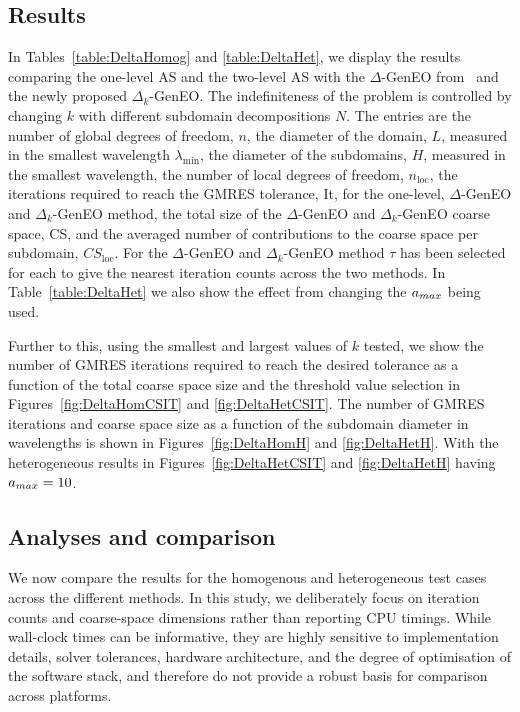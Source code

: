 \documentclass[preprint,3p,times]{elsarticle}
\newcommand{\amax}{a_{\textup{\textsf{max}}}}
\theoremstyle{definition}
\numberwithin{equation}{section}
\begin{document}
{\subsection{Results}
In Tables~\ref{table:DeltaHomog} and \ref{table:DeltaHet}, we display the results comparing the one-level AS and the two-level AS 
with the $\Delta$-GenEO from~\cite{Bootland:2022:OSM} and the newly proposed $\Delta_k$-GenEO. 
The indefiniteness of the problem is controlled by changing $k$ with different subdomain decompositions $N$.
The entries are the number of global degrees of freedom, $n$, the diameter of the domain, $L$, 
measured in the smallest wavelength $\lambda_\text{min}$, the diameter of the subdomains, $H$, measured in the smallest wavelength, 
the number of local degrees of freedom, $n_\text{loc}$, the iterations required to reach the GMRES tolerance, It, for the one-level, 
$\Delta$-GenEO and $\Delta_k$-GenEO method, the total size of the $\Delta$-GenEO and $\Delta_k$-GenEO coarse space, CS, 
and the averaged number of contributions to the coarse space per subdomain, $CS_\text{loc}$. 
For the $\Delta$-GenEO and $\Delta_k$-GenEO method $\tau$ has been selected for each to give the nearest iteration counts across the two methods. 
In Table~\ref{table:DeltaHet} we also show the effect from changing the $\amax$ being used. 

Further to this, using the smallest and largest values of $k$ tested, we show the number of GMRES iterations required 
to reach the desired tolerance as a function of the total coarse space size and the threshold value selection in 
Figures~\ref{fig:DeltaHomCSIT} and \ref{fig:DeltaHetCSIT}. 
The number of GMRES iterations and coarse space size as a function of the subdomain diameter in wavelengths is 
shown in Figures~\ref{fig:DeltaHomH} and \ref{fig:DeltaHetH}. 
With the heterogeneous results in Figures~\ref{fig:DeltaHetCSIT} and \ref{fig:DeltaHetH} having $\amax=10$.

\subsection{Analyses and comparison}

We now compare the results for the homogenous and heterogeneous test cases across the different methods. 
{In this study, we deliberately focus on iteration counts and coarse-space dimensions rather than reporting CPU timings. 
While wall-clock times can be informative, they are highly sensitive to implementation details, solver tolerances, hardware architecture, 
and the degree of optimisation of the software stack, and therefore do not provide a robust basis for comparison across platforms.}

}
\end{document}
